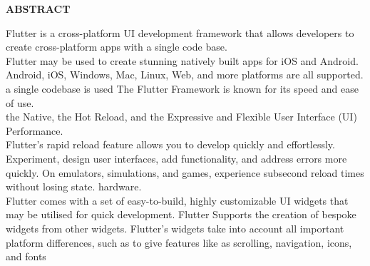 \begin{center}
{\Large{\bf{ABSTRACT}}}
\end{center}
Flutter is a cross-platform UI development framework that allows developers to create cross-platform apps with a single code base.\\
Flutter may be used to create stunning natively built apps for iOS and Android.
Android, iOS, Windows, Mac, Linux, Web, and more platforms are all supported.
a single codebase is used
The Flutter Framework is known for its speed and ease of use.\\
the Native, the Hot Reload, and the Expressive and Flexible User Interface (UI)
Performance.\\
Flutter's rapid reload feature allows you to develop quickly and effortlessly.
Experiment, design user interfaces, add functionality, and address errors more quickly. On emulators, simulations, and games, experience subsecond reload times without losing state.
hardware.\\
Flutter comes with a set of easy-to-build, highly customizable UI widgets that may be utilised for quick development. Flutter
Supports the creation of bespoke widgets from other widgets. Flutter's widgets take into account all important platform differences, such as
to give features like as scrolling, navigation, icons, and fonts\\
\clearpage